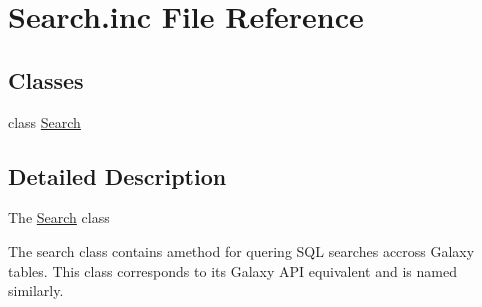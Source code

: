 \hypertarget{Search_8inc}{}\section{Search.\+inc File Reference}
\label{Search_8inc}
\subsection*{Classes}
\begin{DoxyCompactItemize}
\item 
class \hyperlink{classSearch}{Search}
\end{DoxyCompactItemize}


\subsection{Detailed Description}
The \hyperlink{classSearch}{Search} class

The search class contains amethod for quering S\+QL searches accross Galaxy tables. This class corresponds to its Galaxy A\+PI equivalent and is named similarly. 